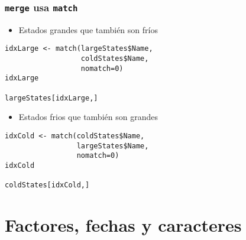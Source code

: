 \documentclass[xcolor={usenames,svgnames,dvipsnames}]{beamer}
\begin{document}
\begin{frame}[fragile]
\frametitle{\texttt{merge} usa \texttt{match}}
\label{sec-4-2-8}

\begin{itemize}
\item Estados grandes que también son fríos
\end{itemize}

\lstset{language=R}
\begin{lstlisting}
idxLarge <- match(largeStates$Name,
                  coldStates$Name,
                  nomatch=0)
idxLarge

largeStates[idxLarge,]
\end{lstlisting}

\begin{itemize}
\item Estados frios que también son grandes
\end{itemize}

\lstset{language=R}
\begin{lstlisting}
idxCold <- match(coldStates$Name,
                 largeStates$Name,
                 nomatch=0)
idxCold

coldStates[idxCold,]
\end{lstlisting}
\end{frame}
\section{Factores, fechas y caracteres}
\label{sec-5}
\end{document}
